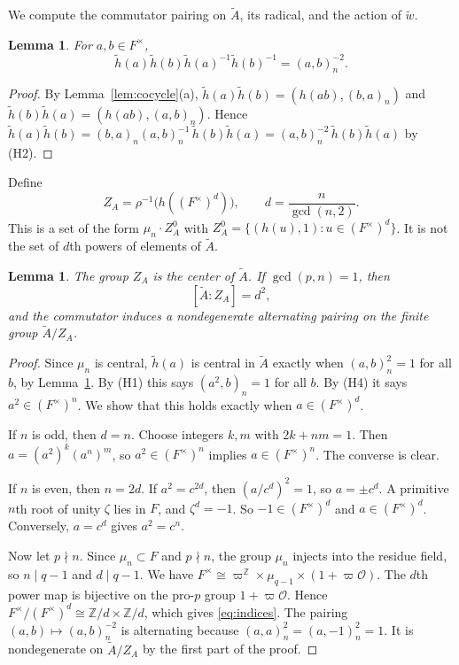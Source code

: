\documentclass[12pt,letterpaper]{article}
\numberwithin{equation}{section}
\theoremstyle{plain}
\newtheorem{lemma}[theorem]{Lemma}
\theoremstyle{definition}
\theoremstyle{remark}
\newcommand{\At}{\widetilde A}
\newcommand{\hl}{\tilde h}
\newcommand{\wt}{\tilde w}
\newcommand{\Zz}{\mathbb Z}
\newcommand{\Of}{\mathcal O}
\newcommand{\ZA}{Z_A}
\begin{document}
We compute the commutator pairing on $\At$, its radical, and the
action of $\wt$.

\begin{lemma}\label{lem:commutator}
For $a,b\in F^\times$,
\begin{equation}\label{eq:commutator}
\hl(a)\hl(b)\hl(a)^{-1}\hl(b)^{-1}=(a,b)_n^{-2}.
\end{equation}
\end{lemma}

\begin{proof}
By Lemma~\ref{lem:cocycle}(a), $\hl(a)\hl(b)=(h(ab),(b,a)_n)$ and
$\hl(b)\hl(a)=(h(ab),(a,b)_n)$. Hence
$\hl(a)\hl(b)=(b,a)_n(a,b)_n^{-1}\,\hl(b)\hl(a)=(a,b)_n^{-2}\,
\hl(b)\hl(a)$ by (H2).
\end{proof}

Define
\begin{equation}\label{eq:Z}
\ZA=\rho^{-1}\bigl(h((F^\times)^d)\bigr),\qquad d=\frac{n}{\gcd(n,2)} .
\end{equation}
This is a set of the form $\mu_n\cdot\ZA^0$ with
$\ZA^0=\{(h(u),1):u\in(F^\times)^d\}$. It is not the set of $d$th
powers of elements of $\At$.

\begin{lemma}\label{lem:radical}
The group $\ZA$ is the center of $\At$. If $\gcd(p,n)=1$, then
\begin{equation}\label{eq:indices}
[\At:\ZA]=d^2,
\end{equation}
and the commutator induces a nondegenerate alternating pairing on the
finite group $\At/\ZA$.
\end{lemma}

\begin{proof}
Since $\mu_n$ is central, $\hl(a)$ is central in $\At$ exactly when
$(a,b)_n^2=1$ for all $b$, by Lemma~\ref{lem:commutator}. By (H1) this
says $(a^2,b)_n=1$ for all $b$. By (H4) it says $a^2\in(F^\times)^n$.
We show that this holds exactly when $a\in(F^\times)^d$.

If $n$ is odd, then $d=n$. Choose integers $k,m$ with $2k+nm=1$. Then
$a=(a^2)^k(a^n)^m$, so $a^2\in(F^\times)^n$ implies
$a\in(F^\times)^n$. The converse is clear.

If $n$ is even, then $n=2d$. If $a^2=c^{2d}$, then $(a/c^d)^2=1$, so
$a=\pm c^d$. A primitive $n$th root of unity $\zeta$ lies in $F$, and
$\zeta^d=-1$. So $-1\in(F^\times)^d$ and $a\in(F^\times)^d$.
Conversely, $a=c^d$ gives $a^2=c^n$.

Now let $p\nmid n$. Since $\mu_n\subset F$ and $p\nmid n$, the group
$\mu_n$ injects into the residue field, so $n\mid q-1$ and $d\mid q-1$.
We have $F^\times\cong\varpi^\Zz\times\mu_{q-1}\times(1+\varpi\Of)$.
The $d$th power map is bijective on the pro-$p$ group $1+\varpi\Of$.
Hence $F^\times/(F^\times)^d\cong\Zz/d\times\Zz/d$, which gives
\eqref{eq:indices}. The pairing $(a,b)\mapsto(a,b)_n^{-2}$ is
alternating because $(a,a)_n^2=(a,-1)_n^2=1$. It is nondegenerate on
$\At/\ZA$ by the first part of the proof.
\end{proof}
\end{document}
